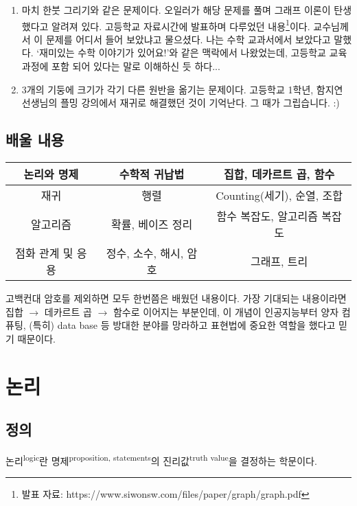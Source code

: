 \documentclass[../note.tex]{subfiles}
\begin{document}
\begin{enumerate}
  \item
    마치 한붓 그리기와 같은 문제이다. 오일러가 해당 문제를 풀며 그래프 이론이 탄생했다고 알려져 있다. 고등학교 자료시간에 발표하며 다루었던 내용\footnote{발표 자료: https://www.siwonsw.com/files/paper/graph/graph.pdf}이다. 교수님께서 이 문제를 어디서 들어 보았냐고 물으셨다. 나는 수학 교과서에서 보았다고 말했다. `재미있는 수학 이야기가 있어요!'와 같은 맥락에서 나왔었는데, 고등학교 교육 과정에 포함 되어 있다는 말로 이해하신 듯 하다...
  \item
    3개의 기둥에 크기가 각기 다른 원반을 옮기는 문제이다. 고등학교 1학년, 함지연 선생님의 플밍 강의에서 재귀로 해결했던 것이 기억난다. 그 때가 그립습니다. :)
\end{enumerate}

\section{배울 내용}
\begin{table}[H]
  \centering
  \begin{tabular}{ c | c | c }
    논리와 명제 & 수학적 귀납법 & 집합, 데카르트 곱, 함수 \\
    \hline
    재귀 & 행렬 & Counting(세기), 순열, 조합 \\
    \hline
    알고리즘 & 확률, 베이즈 정리 & 함수 복잡도, 알고리즘 복잡도 \\
    \hline
    점화 관계 및 응용 & 정수, 소수, 해시, 암호 & 그래프, 트리
  \end{tabular}
\end{table}
고백컨대 암호를 제외하면 모두 한번쯤은 배웠던 내용이다. 가장 기대되는 내용이라면 집합 $\rightarrow$ 데카르트 곱 $\rightarrow$ 함수로 이어지는 부분인데, 이 개념이 인공지능부터 양자 컴퓨팅, (특히) data base 등 방대한 분야를 망라하고 표현법에 중요한 역할을 했다고 믿기 때문이다.

\chapter{논리}
\section{정의}
\begin{definition}[논리]
  논리\textsuperscript{logic}란 명제\textsuperscript{proposition, statements}의 진리값\textsuperscript{truth value}을 결정하는 학문이다.
\end{definition}
\end{document}
